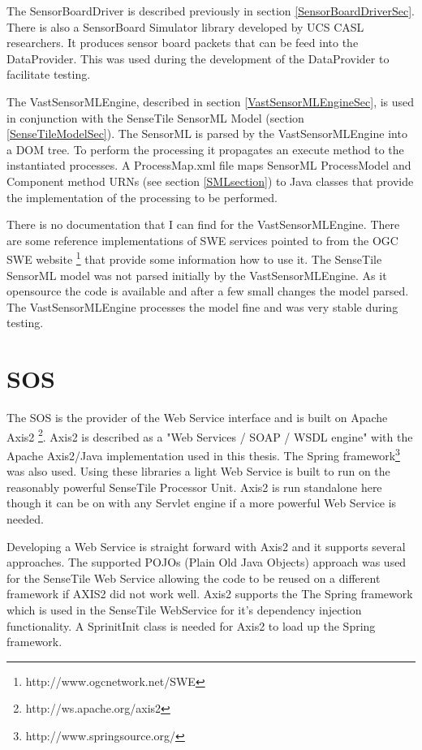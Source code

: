 \documentclass[]{final_report}
\begin{document}
The SensorBoardDriver is described previously in section \ref{SensorBoardDriverSec}. There is also a SensorBoard Simulator library developed by UCS CASL researchers. It produces sensor board packets that can be feed into the DataProvider. This was used during the development of the DataProvider to facilitate testing. 

The VastSensorMLEngine, described in section \ref{VastSensorMLEngineSec}, is used in conjunction with the SenseTile SensorML Model (section \ref{SenseTileModelSec}). The SensorML is parsed by the VastSensorMLEngine into a DOM tree. To perform the processing it propagates an execute method to the instantiated processes. A ProcessMap.xml file maps SensorML ProcessModel and Component method  URNs  (see section \ref{SMLsection}) to Java classes that provide the implementation of the processing to be performed. 

There is no documentation that I can find for the VastSensorMLEngine. There are some reference implementations of SWE services pointed to from the OGC SWE website \footnote{http://www.ogcnetwork.net/SWE} that provide some information how to use it. The SenseTile SensorML model was not parsed initially by the VastSensorMLEngine. As it opensource the code is available and after a few small changes the model parsed. The VastSensorMLEngine processes the model fine and was very stable during testing.


\section{SOS}
The SOS is the provider of the Web Service interface and is built on Apache Axis2 \footnote{http://ws.apache.org/axis2}. 
Axis2 is described as a "Web Services / SOAP / WSDL engine"  with the Apache Axis2/Java implementation used in this thesis. The Spring framework\footnote{http://www.springsource.org/} was also used. Using these libraries a light Web Service is built to run on the reasonably powerful SenseTile Processor Unit. Axis2 is run standalone here though it can be on with any Servlet engine if a more powerful Web Service is needed.

Developing a Web Service is straight forward with Axis2 and it supports several approaches. The supported POJOs (Plain Old Java Objects) approach was used for the SenseTile Web Service allowing the code to be reused on a different framework if AXIS2 did not work well. Axis2 supports the The Spring framework which is used in the SenseTile WebService for it's dependency injection functionality. A SprinitInit class is needed for Axis2 to load up the Spring framework.
\end{document}
